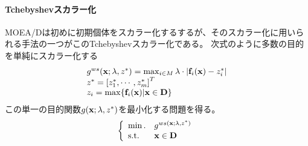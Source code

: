 \documentclass{rentai-chugoku}
\begin{document}
\paragraph{Tchebyshevスカラー化}
MOEA/Dは初めに初期個体をスカラー化するするが、そのスカラー化に用いられる手法の一つがこのTchebyshevスカラー化である。
次式のように多数の目的を単純にスカラー化する
\begin{equation}
\begin{array}{ll}
g^{ws}({\bf x}; \lambda,z^*)=\max_{i \in M} {{\lambda \cdot |{\bf f}_i({\bf x})-z_i^*|}}
\\
z^* = \left[ z^*_1, \cdots, z^*_m \right]^T
\\
z_i = \max\{ {\bf f}_i({\bf x})|{\bf x} \in {\bf D} \}  
\end{array}
\end{equation}
この単一の目的関数$g({\bf x}; \lambda,z^*)$を最小化する問題を得る。
\begin{equation}
\left\{
\begin{array}{ll}
\min.& g^{ws\left({\bf x}; \lambda , z^*\right)}
\\
{\rm s.t.}& {\bf x} \in {\bf D}
\end{array}
\right.
\end{equation}
\end{document}
